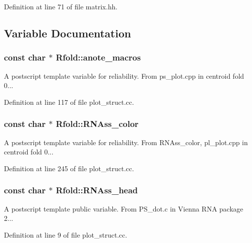 Definition at line 71 of file matrix.\+hh.



\subsection{Variable Documentation}
\hypertarget{namespace_rfold_a021c8cd72fb29fa8491544b7eb90110e}{
\subsubsection[{anote\+\_\+macros}]{\setlength{\rightskip}{0pt plus 5cm}const char $\ast$ Rfold\+::anote\+\_\+macros}}\label{namespace_rfold_a021c8cd72fb29fa8491544b7eb90110e}
A postscript template variable for reliability. From ps\+\_\+plot.\+cpp in centroid fold 0... 

Definition at line 117 of file plot\+\_\+struct.\+cc.

\hypertarget{namespace_rfold_a932e8cd670479c52a8d791ec7377ff87}{
\subsubsection[{R\+N\+Ass\+\_\+color}]{\setlength{\rightskip}{0pt plus 5cm}const char $\ast$ Rfold\+::\+R\+N\+Ass\+\_\+color}}\label{namespace_rfold_a932e8cd670479c52a8d791ec7377ff87}
A postscript template variable for reliability. From R\+N\+Ass\+\_\+color, pl\+\_\+plot.\+cpp in centroid fold 0... 

Definition at line 245 of file plot\+\_\+struct.\+cc.

\hypertarget{namespace_rfold_ab54ee07a82c4554e95d1149302e034a8}{
\subsubsection[{R\+N\+Ass\+\_\+head}]{\setlength{\rightskip}{0pt plus 5cm}const char $\ast$ Rfold\+::\+R\+N\+Ass\+\_\+head}}\label{namespace_rfold_ab54ee07a82c4554e95d1149302e034a8}
A postscript template public variable. From P\+S\+\_\+dot.\+c in Vienna R\+N\+A package 2... 

Definition at line 9 of file plot\+\_\+struct.\+cc.

